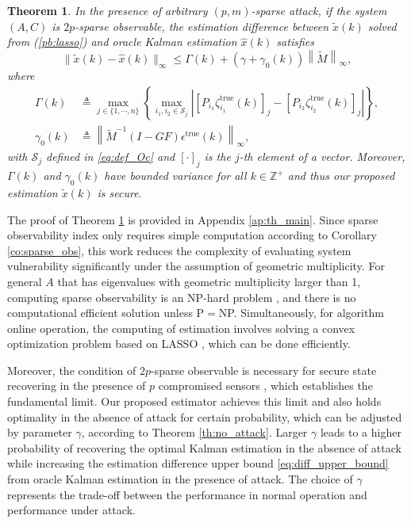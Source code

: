 \documentclass{ieeetrans}   %
\newcommand{\Zb}{{\mathbb{Z}}}
\newcommand{\Sc}{{\mathcal{S}}}
\newcommand{\ift}{{\infty}}
\newcommand{\re}{\text{true}}
\newtheorem{theorem}{\textbf{Theorem}}
\begin{document}
\begin{theorem}\label{th:main}
In the presence of arbitrary $(p,m)$-sparse attack, if the system $(A,C)$ is $2p$-sparse observable, the estimation difference between $\tilde{x}(k)$ solved from (\ref{pb:lasso}) and oracle Kalman estimation $\hat{x}(k)$ satisfies
\begin{equation}\label{eq:diff_upper_bound}
	\|\tilde{x}(k)-\hat{x}(k)\|_\ift\leq \Gamma(k)+\left(\gamma+\gamma_0(k) \right) \left\|\tilde{M}\right\|_\ift,
\end{equation}
where
\begin{align*}
	\Gamma(k) &\triangleq \max_{j\in\{1,\cdots,n\}}\left\{ \max_{i_1,i_2\in \Sc_j} \left| \left[P_{i_1} \zeta^\re_{i_1}(k)\right]_j- \left[P_{i_2} \zeta^\re_{i_2}(k)\right]_j \right| \right \}, \\
	\gamma_0(k)&\triangleq \left\| \tilde{M}^{-1}\left(I-GF\right) \epsilon^\re(k)\right\|_{\infty},
\end{align*}
with $\Sc_j$ defined in \eqref{eq:def_Oc} and $[\cdot]_j$ is the $j$-th element of a vector.
Moreover, $\Gamma(k)$ and $\gamma_0(k)$ have bounded variance for all $k\in\Zb^+$ and thus our proposed estimation $\tilde{x}(k)$ is secure. 
\end{theorem}



The proof of Theorem \ref{th:main} is provided in Appendix \ref{ap:th_main}.
Since sparse observability index only requires simple computation according to Corollary \ref{co:sparse_obs}, this work reduces the complexity of evaluating system vulnerability significantly under the assumption of geometric multiplicity.
For general $A$ that has eigenvalues with geometric multiplicity larger than 1, computing sparse observability is an NP-hard problem \cite{yanwen_CDC19}\cite{sandberg_TAC2014}, and there is no computational efficient solution unless P$=$NP. Simultaneously, for algorithm online operation, the computing of estimation involves solving a convex optimization problem based on LASSO \cite{LASSOTibshirani}, which can be done efficiently.

Moreover, the condition of $2p$-sparse observable is necessary for secure state recovering in the presence of $p$ compromised sensors \cite{ShoukryTAC2016}, which establishes the fundamental limit. Our proposed estimator achieves this limit and also holds optimality in the absence of attack for certain probability, which can be adjusted by parameter $\gamma$, according to Theorem \ref{th:no_attack}.
Larger $\gamma$ leads to a higher probability of recovering the optimal Kalman estimation in the absence of attack while increasing the estimation difference upper bound \eqref{eq:diff_upper_bound} from oracle Kalman estimation in the presence of attack. The choice of $\gamma$ represents the trade-off between the performance in normal operation and performance under attack. 
\end{document}
